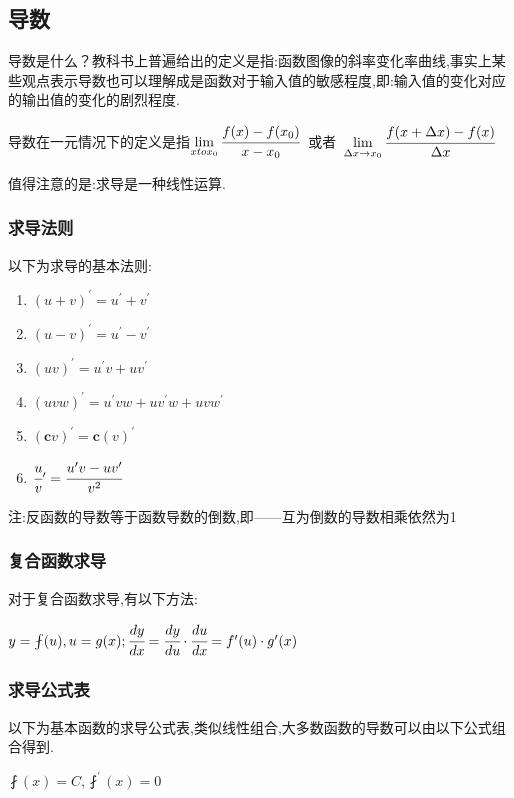 \documentclass[UTF8,12pt]{ctexbook}
\newcommand{\limNormal}[1]{\lim\limits_{#1}}
\newcommand{\derivative}{^\prime}
\begin{document}
{{\subsection{导数}{
  导数是什么？教科书上普遍给出的定义是指:函数图像的斜率变化率曲线,事实上某些观点表示导数也可以理解成是函数对于输入值的敏感程度,即:输入值的变化对应的输出值的变化的剧烈程度.

  导数在一元情况下的定义是指$\limNormal{x to x_0}\cfrac{f(x) - f(x_0)}{x - x_0}$\ 或者\ $\limNormal{\Delta x \to x_0}\cfrac{f(x + \Delta x) - f(x)}{\Delta x}$

  值得注意的是:求导是一种线性运算.

  \subsubsection{求导法则}{
    以下为求导的基本法则:
    \begin{enumerate}
      \item $(u + v)\derivative = u\derivative + v\derivative$
      \item $(u - v)\derivative = u\derivative - v\derivative$
      \item $(uv)\derivative = u\derivative v + uv\derivative$
      \item $(uvw)\derivative = u\derivative vw + uv\derivative w + uvw\derivative$
      \item $(\mathbf{c}v)\derivative = \mathbf{c}(v)\derivative$
      \item $\cfrac{u}{v}\derivative = \cfrac{u\derivative v - uv\derivative}{v^2}$
    \end{enumerate}
    注:反函数的导数等于函数导数的倒数,即——互为倒数的导数相乘依然为1
  }%

  \subsubsection{复合函数求导}{
    对于复合函数求导,有以下方法:

    $y = \fint(u), u = g(x); \cfrac{dy}{dx} = \cfrac{dy}{du} \cdot \cfrac{du}{dx} = f\derivative(u) \cdot g\derivative(x)$
  }%

  \subsubsection{求导公式表}{
    以下为基本函数的求导公式表,类似线性组合,大多数函数的导数可以由以下公式组合得到.

    $\fint(x) = C, \fint\derivative(x) = 0$

}}}}
\end{document}
